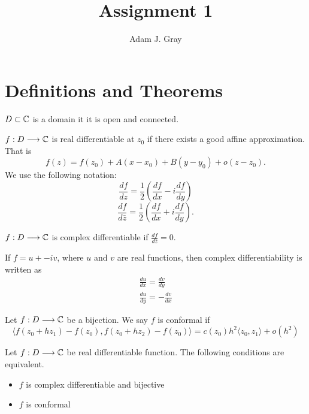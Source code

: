 \documentclass{unswmaths}
\begin{document}
\author{Adam J. Gray}
\title{Assignment 1}
\subject{Complex Analysis}

\section*{Definitions and Theorems}

\begin{definition}
    $ D \subset \mathbb{C} $ is a domain it it is open and connected.
\end{definition}

\begin{definition}
    $ f : D \longrightarrow \mathbb{C} $ is real differentiable at $ z_0 $ if there exists a good affine approximation. That is
    $$
        f(z) = f(z_0) + A(x - x_0) + B(y-y_0) + o(z-z_0).
    $$
We use the following notation:
    $$
        \frac{df}{dz} = \frac{1}{2} \left( \frac{df}{dx} - i \frac{df}{dy} \right)
    $$
    $$
        \frac{df}{d\bar{z}} = \frac{1}{2} \left( \frac{df}{dx} + i \frac{df}{dy} \right).
    $$
\end{definition}
\begin{definition}
    $ f : D \longrightarrow \mathbb{C} $ is complex differentiable if $ \frac{df}{d\bar{z}} = 0 $.
\end{definition}
\begin{lemma}
    If $ f = u + -iv $, where $ u $ and $ v $ are real functions, then complex differentiability is written as 
    \begin{align}
        \frac{du}{dx} = \frac{dv}{dy} \\
        \frac{du}{dy} = -\frac{dv}{dx}
    \end{align}
\end{lemma}

\begin{definition}
    Let $ f : D \longrightarrow \mathbb{C} $ be a bijection. We say $ f $ is conformal if
    $$ \langle f(z_0 + hz_1) - f(z_0), f(z_0 + hz_2) - f(z_0) \rangle = c(z_0) h^2\langle z_0, z_1 \rangle + o(h^2) $$
\end{definition}

\begin{theorem}
    Let $ f : D \longrightarrow \mathbb{C} $ be real differentiable function. The following conditions are equivalent.
    \begin{itemize}
        \item $ f $ is complex differentiable and bijective \\
        \item $ f $ is conformal
    \end{itemize}
\end{theorem}
\end{document}
